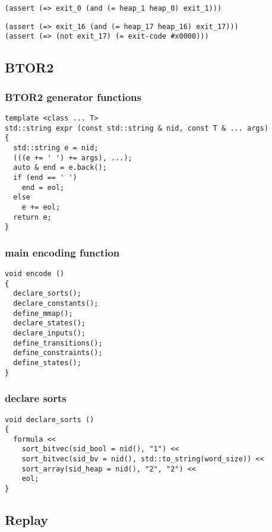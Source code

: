 \begin{lstlisting}[language=SMTLib]
(assert (=> exit_0 (and (= heap_1 heap_0) exit_1)))
\end{lstlisting}

\begin{lstlisting}[language=SMTLib]
(assert (=> exit_16 (and (= heap_17 heap_16) exit_17)))
(assert (=> (not exit_17) (= exit-code #x0000)))
\end{lstlisting}

\subsection{BTOR2}

\subsubsection{BTOR2 generator functions}

\begin{lstlisting}[style=c++]
template <class ... T>
std::string expr (const std::string & nid, const T & ... args)
{
  std::string e = nid;
  (((e += ' ') += args), ...);
  auto & end = e.back();
  if (end == ' ')
    end = eol;
  else
    e += eol;
  return e;
}
\end{lstlisting}

\subsubsection{main encoding function}

\begin{lstlisting}[style=c++]
void encode ()
{
  declare_sorts();
  declare_constants();
  define_mmap();
  declare_states();
  declare_inputs();
  define_transitions();
  define_constraints();
  define_states();
}
\end{lstlisting}

\subsubsection{declare sorts}

\begin{lstlisting}[style=c++]
void declare_sorts ()
{
  formula <<
    sort_bitvec(sid_bool = nid(), "1") <<
    sort_bitvec(sid_bv = nid(), std::to_string(word_size)) <<
    sort_array(sid_heap = nid(), "2", "2") <<
    eol;
}
\end{lstlisting}

\subsection{Replay}

